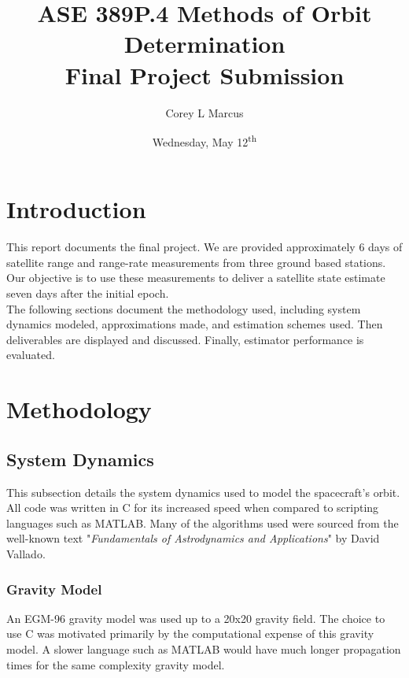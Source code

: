 \documentclass[11pt]{article}
\title{ASE 389P.4 Methods of Orbit Determination \\ Final Project Submission}
\author{Corey L Marcus} \date{Wednesday, May 12\textsuperscript{th}}
\def\CC{{C\nolinebreak[4]\hspace{-.05em}\raisebox{.4ex}{\tiny\bf ++}}}
\begin{document}
\onehalfspace
\maketitle


\section{Introduction}

This report documents the final project. We are provided approximately 6 days of satellite range and range-rate measurements from three ground based stations. Our objective is to use these measurements to deliver a satellite state estimate seven days after the initial epoch. \\

The following sections document the methodology used, including system dynamics modeled, approximations made, and estimation schemes used. Then deliverables are displayed and discussed. Finally, estimator performance is evaluated.

\section{Methodology}

\subsection{System Dynamics}

This subsection details the system dynamics used to model the spacecraft's orbit. All code was written in {\CC} for its increased speed when compared to scripting languages such as MATLAB. Many of the algorithms used were sourced from the well-known text "\textit{Fundamentals of Astrodynamics and Applications}" by David Vallado.

\subsubsection{Gravity Model}

An EGM-96 gravity model was used up to a 20x20 gravity field. The choice to use {\CC} was motivated primarily by the computational expense of this gravity model. A slower language such as MATLAB would have much longer propagation times for the same complexity gravity model.
\end{document}
